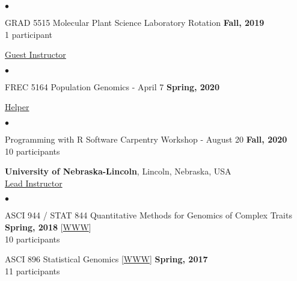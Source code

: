 \documentclass[margin,line,10pt]{res}
\newenvironment{list2}{
  \begin{list}{$\bullet$}{%
      \setlength{\itemsep}{0in}
      \setlength{\parsep}{0in} \setlength{\parskip}{0in}
      \setlength{\topsep}{0in} \setlength{\partopsep}{0in} 
      \setlength{\leftmargin}{0.2in}}}{\end{list}}
\begin{document}
\begin{resume}
\begin{list2}
     \vspace{0.5cm}

     
\item GRAD 5515 Molecular Plant Science Laboratory Rotation
  \hfill {\bf Fall, 2019} \\
  1 participant

\end{list2}

     \vspace{0.3cm}


\underline{Guest Instructor}
 \vspace{0.4cm}
 \begin{list2}
 \item FREC 5164 Population Genomics - April 7  \hfill {\bf Spring, 2020}
\end{list2}


 \vspace{0.3cm}


\underline{Helper}
 \vspace{0.4cm}
 \begin{list2}
 \item Programming with R Software Carpentry Workshop - August 20  \hfill {\bf Fall, 2020} \\
   10  participants 
\end{list2}

 
      \vspace{1cm}


{\bf University of Nebraska-Lincoln}, Lincoln, Nebraska, USA  \vspace{0.2cm} \\
\underline{Lead Instructor}
\vspace{0.4cm}
\begin{list2}

\item ASCI 944 / STAT 844 Quantitative Methods for Genomics of Complex Traits
  \hfill {\bf Spring, 2018} 
         [\textcolor{blue}{\href{http://morotalab.org/asci944-2018/ASCI944.html}{WWW}}] \\
         10  participants %

   \vspace{0.5cm}

\item ASCI 896 Statistical Genomics [\textcolor{blue}{\href{http://morotalab.org/asci896-2017/ASCI896.html}{WWW}}]
  \hfill {\bf Spring, 2017} \\
  11  participants   %

  \vspace{0.5cm}


\end{list2}
\end{resume}
\end{document}
